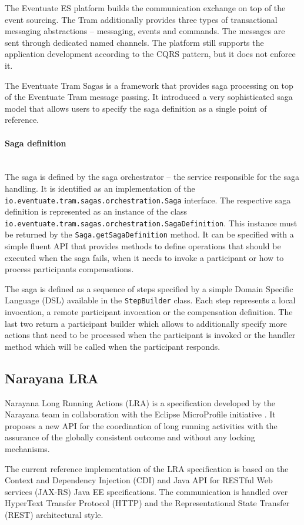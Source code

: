 \documentclass[oneside,
  digital, %
  table,   %
  lof,     %
  lot,     %
]{fithesis3}
\newcommand{\newlinepar}[1]{\paragraph{#1}\needspace{3\baselineskip}\mbox{}\\}
\begin{document}
The Eventuate ES platform builds the communication exchange on top of the event sourcing. The Tram additionally provides three types of transactional messaging abstractions -- messaging, events and commands. The messages are sent through dedicated named channels. The platform still supports the application development according to the CQRS pattern, but it does not enforce it.

The Eventuate Tram Sagas is a framework that provides saga processing on top of the Eventuate Tram message passing. It introduced a very sophisticated saga model that allows users to specify the saga definition as a single point of reference. 

\newlinepar{Saga definition}

The saga is defined by the saga orchestrator -- the service responsible for the saga handling. It is identified as an implementation of the \texttt{io.eventuate.tram.sagas.orchestration.Saga} interface. The respective saga definition is represented as an instance of the class \texttt{io.eventuate.tram.sagas.orchestration.SagaDefinition}. This instance must be returned by the \texttt{Saga.getSagaDefinition} method. It can be specified with a simple fluent API that provides methods to define operations that should be executed when the saga fails, when it needs to invoke a participant or how to process participants compensations. 

The saga is defined as a sequence of steps specified by a simple Domain Specific Language (DSL) available in the \texttt{StepBuilder} class. Each step represents a local invocation, a remote participant invocation or the compensation definition. The last two return a participant builder which allows to additionally specify more actions that need to be processed when the participant is invoked or the handler method which will be called when the participant responds.

\subsection{Narayana LRA}

Narayana Long Running Actions (LRA) is a specification developed by the Narayana team in collaboration with the Eclipse MicroProfile initiative \cite{saga-impl-comp}. It proposes a new API for the coordination of long running activities with the assurance of the globally consistent outcome and without any locking mechanisms.

The current reference implementation of the LRA specification is based on the Context and Dependency Injection (CDI) and Java API for RESTful Web services (JAX-RS) Java EE specifications. The communication is handled over HyperText Transfer Protocol (HTTP) and the Representational State Transfer (REST) architectural style.
\end{document}
